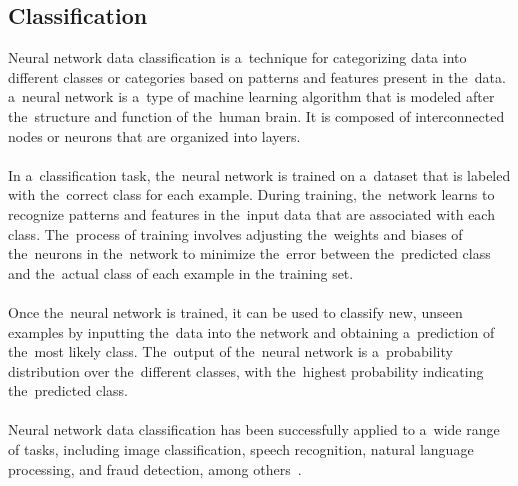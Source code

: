     \subsection{Classification} \label{subsec:clasification}
    Neural network data classification is a~technique for categorizing data into different classes or categories based on patterns and features present in the~data. a~neural network is a~type of machine learning algorithm that is modeled after the~structure and function of the~human brain. It is composed of interconnected nodes or neurons that are organized into layers.\\
    \\
    In a~classification task, the~neural network is trained on a~dataset that is labeled with the~correct
class for each example. During training, the~network learns to recognize patterns and features in the~input data
that are associated with each class. The~process of training involves adjusting the~weights and biases of the~neurons in the~network to minimize the~error between the~predicted class and the~actual class of each example in the training set.\\
    \\
    Once the~neural network is trained, it can be used to classify new, unseen examples by inputting the~data into the network and obtaining a~prediction of the~most likely class. The~output of the~neural network is a~probability distribution over the~different classes, with the~highest probability indicating the~predicted class.\\
    \\
    Neural network data classification has been successfully applied to a~wide range of tasks, including image
classification, speech recognition, natural language processing, and fraud detection, among others~\cite{feraud2002methodology}.

